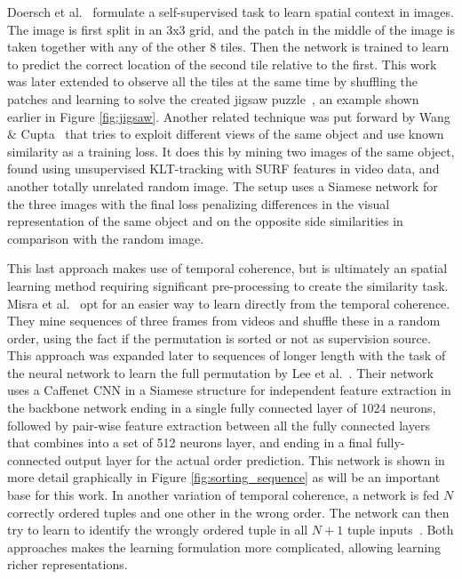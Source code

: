 Doersch et al.~\cite{doersch2015} formulate a self-supervised task to learn spatial context in images. The image is first split in an 3x3 grid, and the patch in the middle of the image is taken together with any of the other 8 tiles. Then the network is trained to learn to predict the correct location of the second tile relative to the first. This work was later extended to observe all the tiles at the same time by shuffling the patches and learning to solve the created jigsaw puzzle~\cite{noroozi2016}, an example shown earlier in Figure \ref{fig:jigsaw}. Another related technique was put forward by Wang \& Cupta~\cite{wang2015} that tries to exploit different views of the same object and use known similarity as a training loss. It does this by mining two images of the same object, found using unsupervised KLT-tracking with SURF features in video data, and another totally unrelated random image. The setup uses a Siamese network for the three images with the final loss penalizing differences in the visual representation of the same object and on the opposite side similarities in comparison with the random image.

This last approach makes use of temporal coherence, but is ultimately an spatial learning method requiring significant pre-processing to create the similarity task. Misra et al.~\cite{misra2016} opt for an easier way to learn directly from the temporal coherence. They mine sequences of three frames from videos and shuffle these in a random order, using the fact if the permutation is sorted or not as supervision source. This approach was expanded later to sequences of longer length with the task of the neural network to learn the full permutation by Lee et al.~\cite{lee2017}. Their network uses a Caffenet\cite{jia2014} CNN in a Siamese structure for independent feature extraction in the backbone network ending in a single fully connected layer of 1024 neurons, followed by pair-wise feature extraction between all the fully connected layers that combines into a set of 512 neurons layer, and ending in a final fully-connected output layer for the actual order prediction. This network is shown in more detail graphically in Figure \ref{fig:sorting_sequence} as will be an important base for this work. In another variation of temporal coherence, a network is fed $N$ correctly ordered tuples and one other in the wrong order. The network can then try to learn to identify the wrongly ordered tuple in all $N+1$ tuple inputs~\cite{fernando2017}. Both approaches makes the learning formulation more complicated, allowing learning richer representations\needref. 

